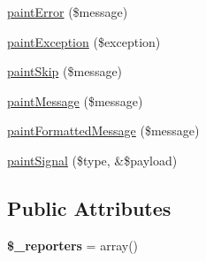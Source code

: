 \begin{DoxyCompactItemize}
\item 
\hyperlink{class_multiple_reporter_aa97458bc8253435cb306fbcfd0d9700c}{paintError} (\$message)
\item 
\hyperlink{class_multiple_reporter_abb9aa4a74a8689c05cbd0535d276f907}{paintException} (\$exception)
\item 
\hyperlink{class_multiple_reporter_a624ac0566b6f0169675309446ee67693}{paintSkip} (\$message)
\item 
\hyperlink{class_multiple_reporter_a3e406bb8e7497250a5c7f740750ed9c9}{paintMessage} (\$message)
\item 
\hyperlink{class_multiple_reporter_aac9b1303434bbeb6a558af840590866e}{paintFormattedMessage} (\$message)
\item 
\hyperlink{class_multiple_reporter_a42b8450ffd5c8af9756cd149f68fb287}{paintSignal} (\$type, \&\$payload)
\end{DoxyCompactItemize}
\subsection*{Public Attributes}
\begin{DoxyCompactItemize}
\item 
\hypertarget{class_multiple_reporter_a0ddb195e646820af4a9c96a682aa7c5f}{
{\bfseries \$\_\-reporters} = array()}
\label{class_multiple_reporter_a0ddb195e646820af4a9c96a682aa7c5f}

\end{DoxyCompactItemize}


